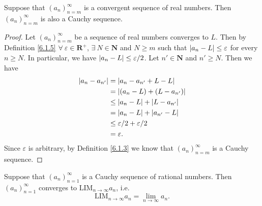 \begin{proposition}\label{6.1.12}
    Suppose that \((a_n)_{n = m}^\infty\) is a convergent sequence of real numbers.
    Then \((a_n)_{n = m}^\infty\) is also a Cauchy sequence.
\end{proposition}

\begin{proof}
    Let \((a_n)_{n = m}^\infty\) be a sequence of real numbers converges to \(L\).
    Then by Definition \ref{6.1.5} \(\forall\ \varepsilon \in \mathbf{R}^+\), \(\exists\ N \in \mathbf{N}\) and \(N \geq m\) such that \(\abs*{a_n - L} \leq \varepsilon\) for every \(n \geq N\).
    In particular, we have \(\abs*{a_n - L} \leq \varepsilon / 2\).
    Let \(n' \in \mathbf{N}\) and \(n' \geq N\).
    Then we have
    \begin{align*}
        \abs*{a_n - a_{n'}} & = \abs*{a_n - a_{n'} + L - L}           \\
                            & = \abs*{(a_n - L) + (L - a_{n'})}       \\
                            & \leq \abs*{a_n - L} + \abs*{L - a_{n'}} \\
                            & = \abs*{a_n - L} + \abs*{a_{n'} - L}    \\
                            & \leq \varepsilon / 2 + \varepsilon / 2  \\
                            & = \varepsilon.
    \end{align*}
    Since \(\varepsilon\) is arbitrary, by Definition \ref{6.1.3} we know that \((a_n)_{n = m}^\infty\) is a Cauchy sequence.
\end{proof}

\setcounter{theorem}{14}
\begin{proposition}\label{6.1.15}
    Suppose that \((a_n)_{n = 1}^\infty\) is a Cauchy sequence of rational numbers.
    Then \((a_n)_{n = 1}^\infty\) converges to \(\text{LIM}_{n \to \infty} a_n\), i.e.
    \[
        \text{LIM}_{n \to \infty} a_n = \lim_{n \to \infty} a_n.
    \]
\end{proposition}


